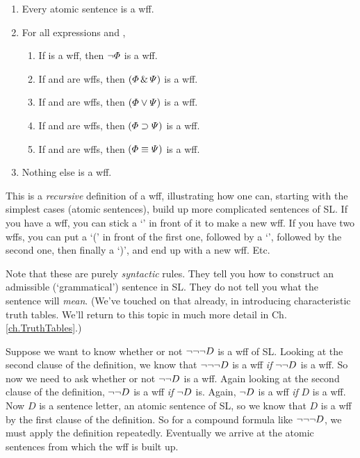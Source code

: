 \begin{enumerate}
\item Every atomic sentence is a wff.
\item For all expressions \metaA{} and \metaB{},
	\begin{enumerate}
		\item If \metaA{} is a wff, then $\neg\varPhi{}$ is a wff.
		\item If \metaA{} and \metaB{} are wffs, then $(\varPhi{}\,\&\,\varPsi{})$ is a wff.
		\item If \metaA{} and \metaB{} are wffs, then $(\varPhi{}\vee\varPsi{})$ is a wff.
		\item If \metaA{} and \metaB{} are wffs, then $(\varPhi{}\supset\varPsi{})$ is a wff.
		\item If \metaA{} and \metaB{} are wffs, then $(\varPhi{}\equiv\varPsi{})$ is a wff.
	\end{enumerate}
\item Nothing else is a wff.
\end{enumerate}

This is a \emph{recursive} definition of a wff, illustrating how one can, starting with the simplest cases (atomic sentences), build up more complicated sentences of SL. If you have a wff, you can stick a `\enot' in front of it to make a new wff. If you have two wffs, you can put a `(' in front of the first one, followed by a `\eand', followed by the second one, then finally a `)', and end up with a new wff. Etc.

Note that these are purely \emph{syntactic} rules. They tell you how to construct an admissible (`grammatical') sentence in SL. They do not tell you what the sentence will \emph{mean}. (We've touched on that already, in introducing characteristic truth tables. We'll return to this topic in much more detail in Ch. \ref{ch.TruthTables}.)

Suppose we want to know whether or not $\neg \neg \neg D$ is a wff of SL. Looking at the second clause of the definition, we know that $\neg \neg \neg D$ is a wff \emph{if} $\neg \neg D$ is a wff. So now we need to ask whether or not $\neg \neg D$ is a wff. Again looking at the second clause of the definition, $\neg \neg D$ is a wff \emph{if} $\neg D$ is. Again, $\neg D$ is a wff \emph{if} $D$ is a wff. Now $D$ is a sentence letter, an atomic sentence of SL, so we know that $D$ is a wff by the first clause of the definition. So for a compound formula like $\neg \neg \neg D$, we must apply the definition repeatedly. Eventually we arrive at the atomic sentences from which the wff is built up.

